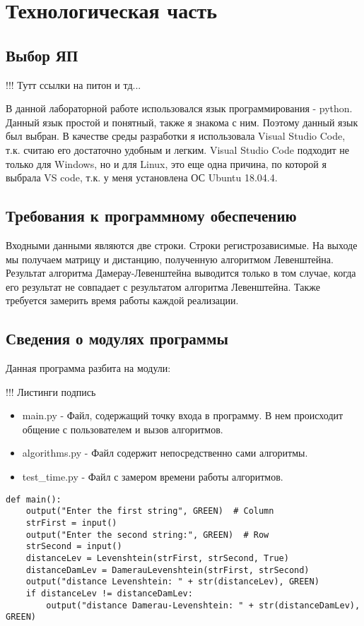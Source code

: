 \chapter{Технологическая часть}

\section{Выбор ЯП}


!!! Тутт ссылки на питон и тд...

В данной лабораторной работе использовался язык программирования - python.
Данный язык простой и понятный, также я знакома с ним.
Поэтому данный язык был выбран. 
В качестве среды разработки я использовала Visual Studio Code, т.к. считаю его достаточно удобным и легким.
Visual Studio Code подходит не только для  Windows, но и для Linux, это еще одна причина, по которой я выбрала VS code, т.к. у меня установлена ОС Ubuntu 18.04.4.

\section{Требования к программному обеспечению}

Входными данными являются две строки. Строки регистрозависимые. На выходе мы получаем матрицу и дистанцию, полученную алгоритмом Левенштейна. Результат алгоритма Дамерау-Левенштейна выводится только в том случае, когда его результат не совпадает с результатом алгоритма Левенштейна. Также требуется замерить время работы каждой реализации.

\section{Сведения о модулях программы}

Данная программа разбита на модули:

!!! Листинги подпись 

\begin{itemize}
	\item main.py - Файл, содержащий точку входа в программу. В нем происходит общение с пользователем и вызов алгоритмов.
	\item algorithms.py - Файл содержит непосредственно сами алгоритмы.
	\item test\_time.py - Файл с замером времени работы алгоритмов.
\end{itemize}

\begin{lstlisting}[label=some-code,caption=Главная функция main]
def main():
	output("Enter the first string", GREEN)  # Column
	strFirst = input()
	output("Enter the second string:", GREEN)  # Row
	strSecond = input()
	distanceLev = Levenshtein(strFirst, strSecond, True)
	distanceDamLev = DamerauLevenshtein(strFirst, strSecond)
	output("distance Levenshtein: " + str(distanceLev), GREEN)
	if distanceLev != distanceDamLev:
		output("distance Damerau-Levenshtein: " + str(distanceDamLev), GREEN)
\end{lstlisting}

